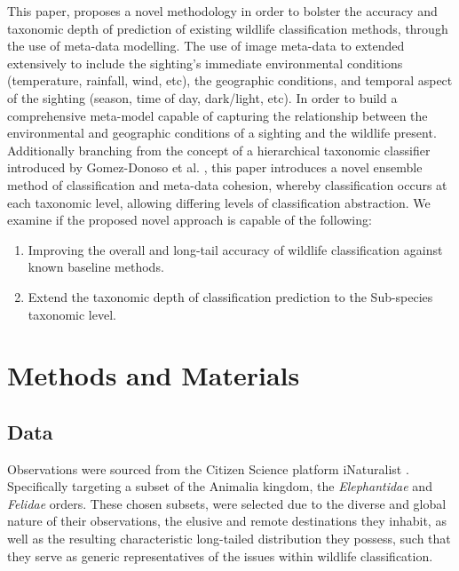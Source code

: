 \documentclass[conference]{IEEEtran}
\begin{document}
    This paper, proposes a novel methodology in order to bolster the accuracy and taxonomic depth of prediction of existing wildlife classification methods, through the use of meta-data modelling. 
    The use of image meta-data to extended extensively to include the sighting's immediate environmental conditions (temperature, rainfall, wind, etc), the geographic conditions, and temporal aspect of the sighting (season, time of day, dark/light, etc). In order to build a comprehensive meta-model capable of capturing the relationship between the environmental and geographic conditions of a sighting and the wildlife present. 
    Additionally branching from the concept of a hierarchical taxonomic classifier introduced by Gomez-Donoso et al. \cite{gomez-donoso_escalona_pérez-esteve_cazorla_2021}, this paper introduces a novel ensemble method of classification and meta-data cohesion, whereby classification occurs at each taxonomic level, allowing differing levels of classification abstraction. 
    We examine if the proposed novel approach is capable of the following: 
    \\
    
    \begin{enumerate}
        \item Improving the overall and long-tail accuracy of wildlife classification against known baseline methods. 
        \item Extend the taxonomic depth of classification prediction to the Sub-species taxonomic level.
    \end{enumerate}


    
\section{Methods and Materials}
    \subsection{Data}
    Observations were sourced from the Citizen Science platform iNaturalist \cite{iNaturalist}. Specifically targeting a subset of the Animalia kingdom, the \textit{Elephantidae} and \textit{Felidae} orders. These chosen subsets, were selected due to the diverse and global nature of their observations, the elusive and remote destinations they inhabit, as well as the resulting characteristic long-tailed distribution they possess, such that they serve as generic representatives of the issues within wildlife classification. 
\end{document}
